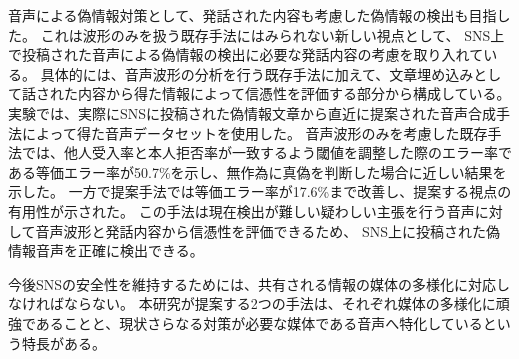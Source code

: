 音声による偽情報対策として、発話された内容も考慮した偽情報の検出も目指した。
これは波形のみを扱う既存手法にはみられない新しい視点として、
SNS上で投稿された音声による偽情報の検出に必要な発話内容の考慮を取り入れている。
具体的には、音声波形の分析を行う既存手法に加えて、文章埋め込みとして話された内容から得た情報によって信憑性を評価する部分から構成している。
実験では、実際にSNSに投稿された偽情報文章から直近に提案された音声合成手法によって得た音声データセットを使用した。
音声波形のみを考慮した既存手法では、他人受入率と本人拒否率が一致するよう閾値を調整した際のエラー率である等価エラー率が50.7\%を示し、無作為に真偽を判断した場合に近しい結果を示した。
一方で提案手法では等価エラー率が17.6\%まで改善し、提案する視点の有用性が示された。
この手法は現在検出が難しい疑わしい主張を行う音声に対して音声波形と発話内容から信憑性を評価できるため、
SNS上に投稿された偽情報音声を正確に検出できる。

今後SNSの安全性を維持するためには、共有される情報の媒体の多様化に対応しなければならない。
本研究が提案する2つの手法は、それぞれ媒体の多様化に頑強であることと、現状さらなる対策が必要な媒体である音声へ特化しているという特長がある。
